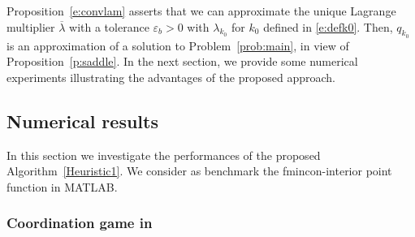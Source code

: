 \documentclass[smallextended,referee,envcountsect,]{svjour3}
\begin{document}
Proposition~\ref{e:convlam} asserts that we can approximate the 
unique
Lagrange multiplier $\overline{\lambda}$ with a tolerance 
$\varepsilon_b>0$ with $\lambda_{k_0}$ for $k_0$ defined in 
\eqref{e:defk0}. Then, $q_{k_0}$ is an approximation of a solution 
to 
Problem~\ref{prob:main}, in view of Proposition~\ref{p:saddle}.
{In the next section,} we provide some numerical experiments 
illustrating 
the advantages of the proposed approach.


\subsection{Numerical results}\label{sec:numerical}

In this section we investigate the performances of the proposed 
Algorithm~\ref{Heuristic1}. We consider as benchmark the 
fmincon-interior point function in MATLAB.

\subsubsection{Coordination game in 
{\cite[Example~2.1]{GossnerHernandezNeyman06}}}\label{sec:GHN}%
\end{document}
